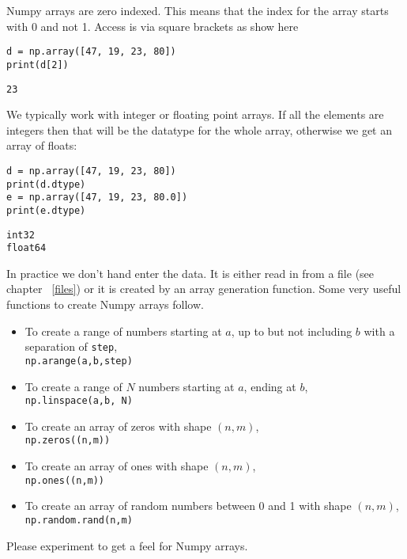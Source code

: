 Numpy arrays are zero indexed. This means that the index for the array
starts with 0 and not 1. Access is via square brackets as show here

\begin{verbatim}
d = np.array([47, 19, 23, 80])
print(d[2])
\end{verbatim}

\begin{verbatim}
23
\end{verbatim}

We typically work with integer or floating point arrays. If all the
elements are integers then that will be the datatype for the whole
array, otherwise we get an array of floats:

\begin{verbatim}
d = np.array([47, 19, 23, 80])
print(d.dtype)
e = np.array([47, 19, 23, 80.0])
print(e.dtype)
\end{verbatim}

\begin{verbatim}
int32
float64
\end{verbatim}

In practice we don't hand enter the data. It is either read in from a
file (see chapter ~\protect\hyperlink{files}{{[}files{]}}) or it is
created by an array generation function. Some very useful functions to
create Numpy arrays follow.

\begin{itemize}
\item
  To create a range of numbers starting at \(a\), up to but not
  including \(b\) with a separation of \texttt{step},\\
  \texttt{np.arange(a,b,step)}
\item
  To create a range of \(N\) numbers starting at \(a\), ending at
  \(b\),\\
  \texttt{np.linspace(a,b,\ N)}
\item
  To create an array of zeros with shape \((n,m)\),\\
  \texttt{np.zeros((n,m))}
\item
  To create an array of ones with shape \((n,m)\),\\
  \texttt{np.ones((n,m))}
\item
  To create an array of random numbers between 0 and 1 with shape
  \((n,m)\),\\
  \texttt{np.random.rand(n,m)}
\end{itemize}

Please experiment to get a feel for Numpy arrays.

